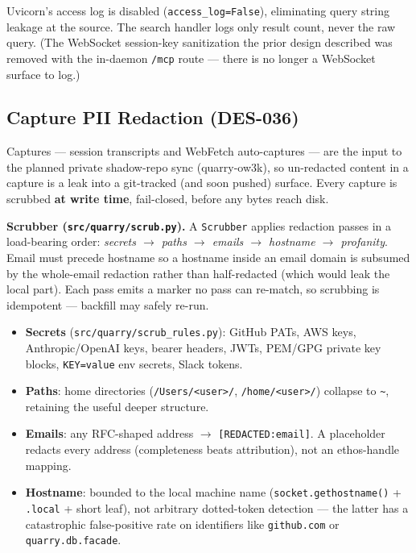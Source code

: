 \documentclass[a4paper,10pt]{article}
\newcommand{\modpath}[1]{\texttt{src/quarry/#1}}
\begin{document}
Uvicorn's access log is disabled (\texttt{access\_log=False}),
eliminating query string leakage at the source.  The search handler
logs only result count, never the raw query.  (The WebSocket
session-key sanitization the prior design described was removed with the
in-daemon \texttt{/mcp} route --- there is no longer a WebSocket surface
to log.)

\subsection{Capture PII Redaction (DES-036)}

Captures --- session transcripts and WebFetch auto-captures --- are the
input to the planned private shadow-repo sync (quarry-ow3k), so
un-redacted content in a capture is a leak into a git-tracked (and soon
pushed) surface.  Every capture is scrubbed \textbf{at write time},
fail-closed, before any bytes reach disk.

\textbf{Scrubber (\modpath{scrub.py}).}  A \texttt{Scrubber} applies
redaction passes in a load-bearing order: \emph{secrets $\to$ paths
$\to$ emails $\to$ hostname $\to$ profanity}.  Email must precede
hostname so a hostname inside an email domain is subsumed by the
whole-email redaction rather than half-redacted (which would leak the
local part).  Each pass emits a marker no pass can re-match, so scrubbing
is idempotent --- backfill may safely re-run.

\begin{itemize}
  \item \textbf{Secrets} (\modpath{scrub\_rules.py}): GitHub PATs, AWS
    keys, Anthropic/OpenAI keys, bearer headers, JWTs, PEM/GPG private
    key blocks, \texttt{KEY=value} env secrets, Slack tokens.
  \item \textbf{Paths}: home directories (\texttt{/Users/<user>/},
    \texttt{/home/<user>/}) collapse to \texttt{\~{}}, retaining the
    useful deeper structure.
  \item \textbf{Emails}: any RFC-shaped address $\to$
    \texttt{[REDACTED:email]}.  A placeholder redacts every address
    (completeness beats attribution), not an ethos-handle mapping.
  \item \textbf{Hostname}: bounded to the local machine name
    (\texttt{socket.gethostname()} + \texttt{.local} + short leaf), not
    arbitrary dotted-token detection --- the latter has a catastrophic
    false-positive rate on identifiers like \texttt{github.com} or
    \texttt{quarry.db.facade}.
\end{itemize}
\end{document}
